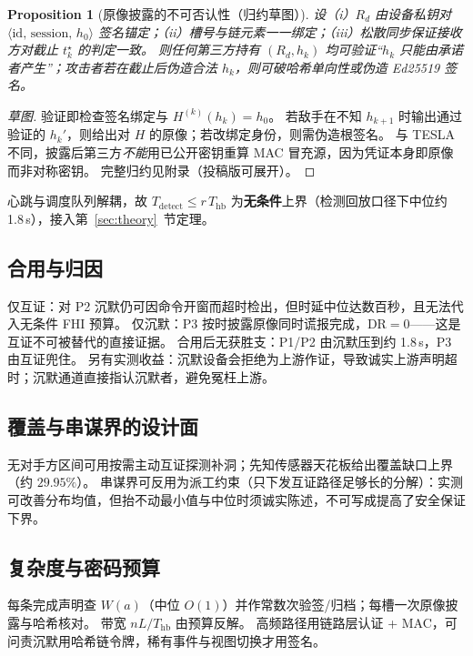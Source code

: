 \documentclass[manuscript,screen,review]{acmart}
\newtheorem{proposition}{Proposition}
\begin{document}
\begin{proposition}[原像披露的不可否认性（归约草图）]
\label{prop:nr}
设（i）$R_d$ 由设备私钥对 $\langle\mathrm{id},\,\mathrm{session},\,h_0\rangle$ 签名锚定；（ii）槽号与链元素一一绑定；（iii）松散同步保证接收方对截止 $t_k^\star$ 的判定一致。
则任何第三方持有 $(R_d,h_k)$ 均可验证``$h_k$ 只能由承诺者产生''；攻击者若在截止后伪造合法 $h_k$，则可破哈希单向性或伪造 Ed25519 签名。
\end{proposition}
\begin{proof}[草图]
验证即检查签名绑定与 $H^{(k)}(h_k)=h_0$。
若敌手在不知 $h_{k+1}$ 时输出通过验证的 $h_k'$，则给出对 $H$ 的原像；若改绑定身份，则需伪造根签名。
与 TESLA 不同，披露后第三方\emph{不能}用已公开密钥重算 MAC 冒充源，因为凭证本身即原像而非对称密钥。
完整归约见附录（投稿版可展开）。
\end{proof}

心跳与调度队列解耦，故 $T_{\mathrm{detect}}\le r\,T_{\mathrm{hb}}$ 为\textbf{无条件}上界（检测回放口径下中位约 1.8\,s），接入第~\ref{sec:theory}~节定理。

\subsection{合用与归因}
\label{sec:compose}

仅互证：对 P2 沉默仍可因命令开窗而超时检出，但时延中位达数百秒，且无法代入无条件 FHI 预算。
仅沉默：P3 按时披露原像同时谎报完成，DR${=}0$——这是互证不可被替代的直接证据。
合用后无获胜支：P1/P2 由沉默压到约 1.8\,s，P3 由互证兜住。
另有实测收益：沉默设备会拒绝为上游作证，导致诚实上游声明超时；沉默通道直接指认沉默者，避免冤枉上游。

\subsection{覆盖与串谋界的设计面}
\label{sec:covdesign}

无对手方区间可用按需主动互证探测补洞；先知传感器天花板给出覆盖缺口上界（约 $29.95\%$）。
串谋界可反用为派工约束（只下发互证路径足够长的分解）：实测可改善分布均值，但抬不动最小值与中位时须诚实陈述，不可写成提高了安全保证下界。

\subsection{复杂度与密码预算}
\label{sec:budget_eng}

每条完成声明查 $W(a)$（中位 $O(1)$）并作常数次验签/归档；每槽一次原像披露与哈希核对。
带宽 $n L/T_{\mathrm{hb}}$ 由预算反解。
高频路径用链路层认证 + MAC，可问责沉默用哈希链令牌，稀有事件与视图切换才用签名。
\end{document}
